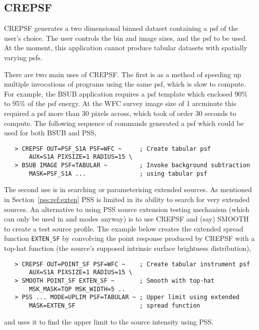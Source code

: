 \subsection{CREPSF}
\label{crepsf}
\PARtabstart
{}
\PARtabend
CREPSF generates a two dimensional binned dataset containing a psf
of the user's choice. The user controls the bin and image sizes, and
the psf to be used. At the moment, this application cannot produce
tabular datasets with spatially varying psfs.

There are two main uses of CREPSF. The first is as a method of
speeding up multiple invocations of programs using the same psf, 
which is slow to compute. For example, the BSUB application
requires a psf template which enclosed 90\% to 95\% of the psf
energy. At the WFC survey image size of 1 arcminute this required
a psf more than 30 pixels across, which took of order 30 seconds
to compute. The following sequence of commands generated a psf
which could be used for both BSUB and PSS,
\begin{verbatim}
   > CREPSF OUT=PSF_S1A PSF=WFC ~     ; Create tabular psf
       AUX=S1A PIXSIZE=1 RADIUS=15 \
   > BSUB IMAGE PSF=TABULAR ~         ; Invoke background subtraction
       MASK=PSF_S1A ...               ; using tabular psf
\end{verbatim}
The second use is in searching or parameterising extended sources.
As mentioned in Section~\ref{pss:ref:exten} PSS is limited in
its ability to search for very extended sources. An alternative to
using PSS source extension testing mechanism (which can only be used
in \mode{SEARCH} and \mode{PARAM} modes anyway) is to use CREPSF
and (say) SMOOTH to create a test source profile. The example below
creates the extended spread function \verb+EXTEN_SF+ by convolving
the point response produced by CREPSF with a top-hat function (the
source's supposed intrinsic surface brightness distribution),
\begin{verbatim}
   > CREPSF OUT=POINT_SF PSF=WFC ~    ; Create tabular instrument psf
       AUX=S1A PIXSIZE=1 RADIUS=15 \
   > SMOOTH POINT_SF EXTEN_SF ~       ; Smooth with top-hat 
       MSK_MASK=TOP MSK_WIDTH=5 ..
   > PSS ... MODE=UPLIM PSF=TABULAR ~ ; Upper limit using extended
       MASK=EXTEN_SF                  ; spread function
\end{verbatim}
and uses it to find the upper limit to the source intensity using PSS.

